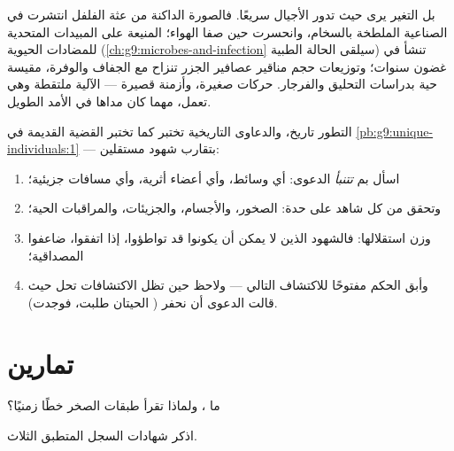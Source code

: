 \begin{example}\label{ex:g9:evidence-of-evolution:live}
بل التغير يرى حيث تدور الأجيال سريعًا. فالصورة الداكنة
من عثة الفلفل انتشرت في  الصناعية الملطخة
بالسخام، وانحسرت حين صفا الهواء؛  المنيعة على
المبيدات  المتحدية للمضادات الحيوية
(\cref{ch:g9:microbes-and-infection} سيلقى الحالة
الطبية) تنشأ في غضون سنوات؛ وتوزيعات حجم مناقير عصافير
الجزر تنزاح مع الجفاف والوفرة، مقيسة حية بدراسات التحليق
والفرجار. حركات صغيرة، وأزمنة قصيرة --- الآلية ملتقطة
وهي تعمل، مهما كان مداها في الأمد الطويل.
\end{example}

\begin{method}\label{met:g9:evidence-of-evolution:weigh}
التطور تاريخ، والدعاوى التاريخية تختبر كما تختبر القضية
القديمة في \cref{pb:g9:unique-individuals:1} --- بتقارب
شهود مستقلين:
\begin{enumerate}
  \item اسأل بم \emph{تتنبأ} الدعوى: أي وسائط، وأي أعضاء
        أثرية، وأي مسافات جزيئية؛
  \item وتحقق من كل شاهد على حدة: الصخور، والأجسام،
        والجزيئات، والمراقبات الحية؛
  \item وزن استقلالها: فالشهود الذين لا يمكن أن يكونوا
        قد تواطؤوا، إذا اتفقوا، ضاعفوا المصداقية؛
  \item وأبق الحكم مفتوحًا للاكتشاف التالي --- ولاحظ حين
        تظل الاكتشافات تحل حيث قالت الدعوى أن نحفر
        ( الحيتان طلبت، فوجدت).
\end{enumerate}
\end{method}

\section{تمارين}

\begin{exercise}[$\star$]\label{exo:g9:evidence-of-evolution:1}
ما ، ولماذا تقرأ طبقات الصخر خطًا زمنيًا؟
\end{exercise}

\begin{exercise}[$\star$]\label{exo:g9:evidence-of-evolution:2}
اذكر شهادات السجل المتطبق الثلاث.
\end{exercise}

